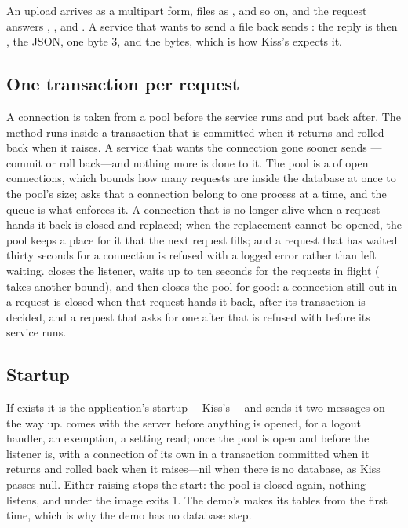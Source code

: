 An upload arrives as a multipart form, files as , 
and so on, and the request answers ,
,  and . A
service that wants to send a file back sends :
the reply is then , the JSON, one byte 3, and the
bytes, which is how Kiss's  expects it.

\subsection{One transaction per request}

A connection is taken from a pool before the service runs and put back after.
The method runs inside a transaction that is committed when it returns and
rolled back when it raises. A service that wants the connection gone sooner
sends ---commit or roll back---and
nothing more is done to it. The pool is a  of open
connections, which bounds how many requests are inside the database at once
to the pool's size;  asks that a connection belong to one
process at a time, and the queue is what enforces it. A connection that is
no longer alive when a request hands it back is closed and replaced; when
the replacement cannot be opened, the pool keeps a place for it that the
next request fills; and a request that has waited thirty seconds for a
connection is refused with a logged error rather than left waiting.
 closes the listener, waits up to ten seconds for the requests in
flight ( takes another bound), and then closes the
pool for good: a connection still out in a request is closed when that
request hands it back, after its transaction is decided, and a request that
asks for one after that is refused with  before
its service runs.

\subsection{Startup}

If  exists it is the application's startup---
Kiss's ---and  sends it two messages on the
way up.  comes with the server before anything is opened, for a
logout handler, an exemption, a setting read;  once the pool is
open and before the listener is, with a connection of its own in a
transaction committed when it returns and rolled back when it raises---nil
when there is no database, as Kiss passes null. Either raising stops the
start: the pool is closed again, nothing listens, and under  the
image exits 1. The demo's  makes its tables from
 the first time, which is why the demo has no database
step.

